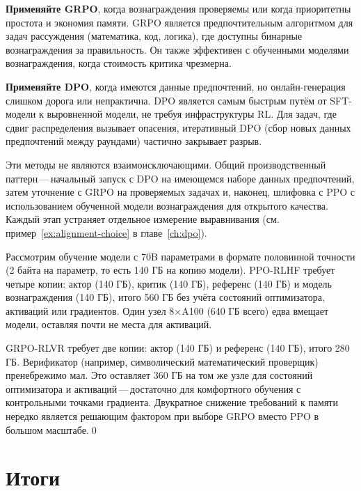 \textbf{Применяйте GRPO}, когда вознаграждения проверяемы или когда приоритетны простота и экономия памяти. GRPO является предпочтительным алгоритмом для задач рассуждения (математика, код, логика), где доступны бинарные вознаграждения за правильность. Он также эффективен с обученными моделями вознаграждения, когда стоимость критика чрезмерна.

\textbf{Применяйте DPO}, когда имеются данные предпочтений, но онлайн-генерация слишком дорога или непрактична. DPO является самым быстрым путём от SFT-модели к выровненной модели, не требуя инфраструктуры RL. Для задач, где сдвиг распределения вызывает опасения, итеративный DPO (сбор новых данных предпочтений между раундами) частично закрывает разрыв.

\begin{remark}
Эти методы не являются взаимоисключающими. Общий производственный паттерн\,---\,начальный запуск с DPO на имеющемся наборе данных предпочтений, затем уточнение с GRPO на проверяемых задачах и, наконец, шлифовка с PPO с использованием обученной модели вознаграждения для открытого качества. Каждый этап устраняет отдельное измерение выравнивания (см. пример~\ref{ex:alignment-choice} в главе~\ref{ch:dpo}).
\end{remark}

\begin{example}
\label{ex:grpo-memory}
Рассмотрим обучение модели с 70B параметрами в формате половинной точности (2 байта на параметр, то есть 140 ГБ на копию модели). PPO-RLHF требует четыре копии: актор (140 ГБ), критик (140 ГБ), референс (140 ГБ) и модель вознаграждения (140 ГБ), итого 560 ГБ без учёта состояний оптимизатора, активаций или градиентов. Один узел 8$\times$A100 (640 ГБ всего) едва вмещает модели, оставляя почти не места для активаций.

GRPO-RLVR требует две копии: актор (140 ГБ) и референс (140 ГБ), итого 280 ГБ. Верификатор (например, символический математический проверщик) пренебрежимо мал. Это оставляет 360 ГБ на том же узле для состояний оптимизатора и активаций\,---\,достаточно для комфортного обучения с контрольными точками градиента. Двукратное снижение требований к памяти нередко является решающим фактором при выборе GRPO вместо PPO в большом масштабе.\qed
\end{example}

\section{Итоги}
\label{sec:grpo-summary}


